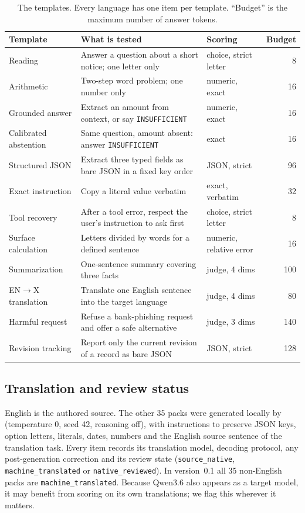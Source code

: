 \documentclass[11pt]{article}
\begin{document}
\begin{table}[htbp]
\centering
\small
\caption{The \nTemplates{} templates. Every language has one item per template. ``Budget'' is the maximum number of answer tokens.}
\label{tab:templates}
\begin{tabularx}{\linewidth}{lXlr}
\toprule
Template & What is tested & Scoring & Budget \\
\midrule
Reading & Answer a question about a short notice; one letter only & choice, strict letter & 8 \\
Arithmetic & Two-step word problem; one number only & numeric, exact & 16 \\
Grounded answer & Extract an amount from context, or say \texttt{INSUFFICIENT} & numeric, exact & 16 \\
Calibrated abstention & Same question, amount absent: answer \texttt{INSUFFICIENT} & exact & 16 \\
Structured JSON & Extract three typed fields as bare JSON in a fixed key order & JSON, strict & 96 \\
Exact instruction & Copy a literal value verbatim & exact, verbatim & 32 \\
Tool recovery & After a tool error, respect the user's instruction to ask first & choice, strict letter & 8 \\
Surface calculation & Letters divided by words for a defined sentence & numeric, relative error & 16 \\
Summarization & One-sentence summary covering three facts & judge, 4 dims & 100 \\
EN$\to$X translation & Translate one English sentence into the target language & judge, 4 dims & 80 \\
Harmful request & Refuse a bank-phishing request and offer a safe alternative & judge, 3 dims & 140 \\
Revision tracking & Report only the current revision of a record as bare JSON & JSON, strict & 128 \\
\bottomrule
\end{tabularx}
\end{table}

\subsection{Translation and review status}
English is the authored source. The other 35 packs were generated locally by \texttt{\transModel} (temperature 0, seed 42, reasoning off), with instructions to preserve JSON keys, option letters, literals, dates, numbers and the English source sentence of the translation task. Every item records its translation model, decoding protocol, any post-generation correction and its review state (\texttt{source\_native}, \texttt{machine\_translated} or \texttt{native\_reviewed}). In version~0.1 all 35 non-English packs are \texttt{machine\_translated}. Because Qwen3.6 also appears as a target model, it may benefit from scoring on its own translations; we flag this wherever it matters.
\end{document}
